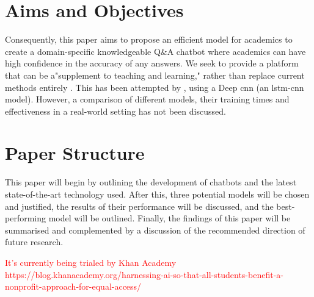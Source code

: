 \section{Aims and Objectives} %
\label{sec:intro_aims_and_objectives}

Consequently, this paper aims to propose an efficient model for academics to create a domain-specific knowledgeable Q\&A chatbot where academics can have high confidence in the accuracy of any answers. We seek to provide a platform that can be a"supplement to teaching and learning," rather than replace current methods entirely \citep{Nee2023ExploringTT}. This has been attempted by \citep{Chen22}, using a Deep \acrlong{cnn} (an \acrshort{lstm}-\acrshort{cnn} model). However, a comparison of different models, their training times and effectiveness in a real-world setting has not been discussed.


\section{Paper Structure}
\label{sec:intro_paper_structure}

This paper will begin by outlining the development of chatbots and the latest state-of-the-art technology used. After this, three potential models will be chosen and justified, the results of their performance will be discussed, and the best-performing model will be outlined. Finally, the findings of this paper will be summarised and complemented by a discussion of the recommended direction of future research. %

\textcolor{red}{It's currently being trialed by Khan Academy https://blog.khanacademy.org/harnessing-ai-so-that-all-students-benefit-a-nonprofit-approach-for-equal-access/}
